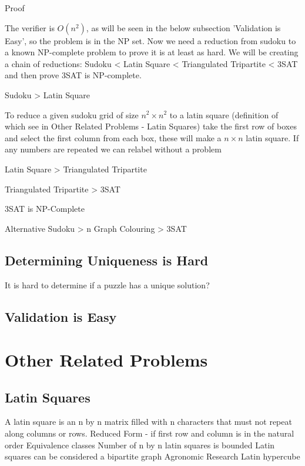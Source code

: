 \documentclass[a4paper,12pt]{article}
\begin{document}
		Proof

		The verifier is $O(n^2)$, as will be seen in the below subsection 'Validation is Easy', so the problem is in the NP set. Now we need a reduction from sudoku to a known NP-complete problem to prove it is at least as hard. We will be creating a chain of reductions: Sudoku < Latin Square < Triangulated Tripartite < 3SAT and then prove 3SAT is NP-complete.

		Sudoku > Latin Square

		To reduce a given sudoku grid of size $n^2 \times n^2$ to a latin square (definition of which see in Other Related Problems - Latin Squares) take the first row of boxes and select the first column from each box, these will make a $n \times n$ latin square. If any numbers are repeated we can relabel without a problem 

		Latin Square > Triangulated Tripartite

		Triangulated Tripartite > 3SAT

		3SAT is NP-Complete

		Alternative Sudoku > n Graph Colouring > 3SAT

	\subsection{Determining Uniqueness is Hard}

		It is hard to determine if a puzzle has a unique solution?
		
	\subsection{Validation is Easy}
\section{Other Related Problems}
	\subsection{Latin Squares}

		A latin square is an n by n matrix filled with n characters that must not repeat along columns or rows.
		Reduced Form -  if first row and column is in the natural order
		Equivalence classes
		Number of n by n latin squares is bounded
		Latin squares can be considered a bipartite graph
		Agronomic Research
		Latin hypercube
\end{document}
